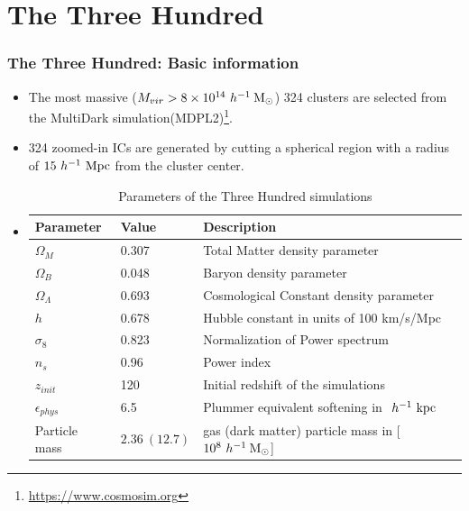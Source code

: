 \documentclass[aspectratio=1610]{beamer}
\newcommand{\hMsun}{~h^{-1}\>{\rm M_\odot}}
\newcommand{\Mpc}{~h^{-1}~{\rm Mpc}}
\newcommand{\Kpc}{~h^{-1}~{\rm kpc}}
\begin{document}
\section{The Three Hundred}
\begin{frame}
  \frametitle{The Three Hundred: Basic information}
  \begin{itemize}
    \item The most massive ($M_{vir} > 8\times 10^{14} \hMsun$) 324 clusters are selected from the MultiDark simulation(MDPL2)\footnote{\url{https://www.cosmosim.org}}.
    \item 324 zoomed-in ICs are generated by cutting a spherical region with a radius of \alert{$15 \Mpc$} from the cluster center.
    \item[]
      \begin{table}
        \fontsize{10}{10}\selectfont
        \caption{Parameters of the Three Hundred simulations}
        \begin{tabular}{lll}
          \hline
          Parameter& Value & Description\\
          \hline
          $\Omega_M$ & 0.307 & Total Matter density parameter\\
          $\Omega_B$ & 0.048 & Baryon density parameter\\
          $\Omega_\Lambda$ & 0.693 & Cosmological Constant density parameter\\
          $h$ & 0.678  & Hubble constant in units of 100 km/s/Mpc\\
          $\sigma_8$ & 0.823 & Normalization of Power spectrum\\
          $n_s$ & 0.96  & Power index\\
          $z_{init}$ & 120 & Initial redshift of the simulations \\
          $\epsilon_{phys}$ & 6.5 & Plummer equivalent softening in $\Kpc$ \\
          Particle mass & $2.36 \ (12.7) $ & gas (dark matter) particle mass in [$10^8 \hMsun$]\\
          \hline
        \end{tabular}
      \end{table}
\end{itemize}
\end{frame}
\end{document}
